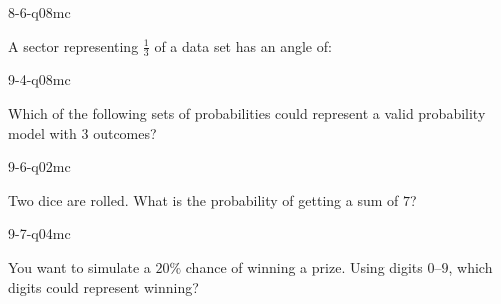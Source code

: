 \begin{practiceQuestion}{8-6-q08}{mc}
\begin{questionText}
A sector representing $\frac{1}{3}$ of a data set has an angle of:
\end{questionText}
\end{practiceQuestion}

\begin{practiceQuestion}{9-4-q08}{mc}
\begin{questionText}
Which of the following sets of probabilities could represent a valid probability model with $3$ outcomes?
\end{questionText}
\end{practiceQuestion}

\begin{practiceQuestion}{9-6-q02}{mc}
\begin{questionText}
Two dice are rolled. What is the probability of getting a sum of $7$?
\end{questionText}
\end{practiceQuestion}

\begin{practiceQuestion}{9-7-q04}{mc}
\begin{questionText}
You want to simulate a $20\%$ chance of winning a prize. Using digits $0$--$9$, which digits could represent winning?
\end{questionText}
\end{practiceQuestion}
